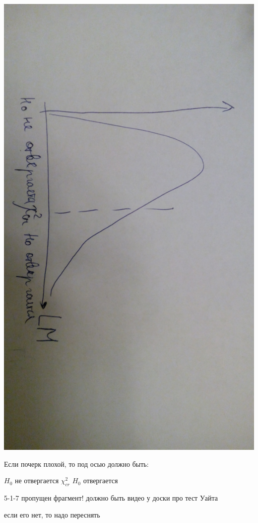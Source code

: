 \documentclass[12pt,a4paper]{article}
\begin{document}
\includegraphics[scale=0.1, angle=90]{white_test.jpg} 

Если почерк плохой, то под осью должно быть:

$H_0$ не отвергается  \hspace{1cm} $\chi^2_{cr}$ \hspace{1cm} $H_0$  отвергается  

5-1-7 пропущен фрагмент! должно быть видео у доски про тест Уайта

если его нет, то надо переснять
\end{document}

